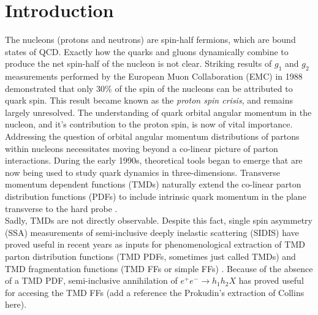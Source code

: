 \chapter{Introduction}

The nucleons (protons and neutrons) are spin-half fermions, which are bound states of QCD.  Exactly how the quarks and gluons dynamically combine to produce the net spin-half of the nucleon is not clear.  Striking results of $g_1$ and $g_2$ measurements performed by the European Muon Collaboration (EMC) in 1988 \cite{pdfs-leader:1988} demonstrated that only $30\%$ of the spin of the nucleons can be attributed to quark spin.  This result became known as the \textit{proton spin crisis}, and remains largely unresolved.  The understanding of quark orbital angular momentum in the nucleon, and it's contribution to the proton spin, is now of vital importance.  \\

Addressing the question of orbital angular momentum distributions of partons within nucleons necessitates moving beyond a co-linear picture of parton interactions.   During the early 1990s, theoretical tools began to emerge that are now being used to study quark dynamics in three-dimensions.  Transverse momentum dependent functions (TMDs) naturally extend the co-linear parton distribution functions (PDFs) to include intrinsic quark momentum in the plane transverse to the hard probe \cite{tmds-mulders:1995, tmds-bacchetta:2006}.  \\

Sadly, TMDs are not directly observable.  Despite this fact, single spin asymmetry (SSA) measurements of semi-inclusive deeply inelastic scattering (SIDIS) have proved useful in recent years as inputs for phenomenological extraction of TMD parton distribution functions (TMD PDFs, sometimes just called TMDs) and TMD fragmentation functions (TMD FFs or simple FFs) \cite{tmds-airapetian:2009, tmds-airapetian:2012, tmds-aghasyan:2017}.  Because of the absence of a TMD PDF, semi-inclusive annihilation of $e^+ e^- \rightarrow h_1 h_2 X$ has proved useful for accesing the TMD FFs (add a reference the Prokudin's extraction of Collins here).  
